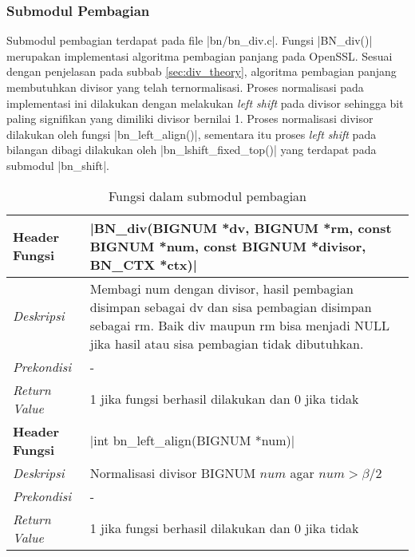 
\subsubsection{Submodul Pembagian} \label{sec:impl_div}
  Submodul pembagian terdapat pada file |bn/bn_div.c|. Fungsi |BN_div()| merupakan implementasi algoritma pembagian panjang pada OpenSSL. Sesuai dengan penjelasan pada subbab \ref{sec:div_theory}, algoritma pembagian panjang membutuhkan divisor yang telah ternormalisasi. Proses normalisasi pada implementasi ini dilakukan dengan melakukan \textit{left shift} pada divisor sehingga bit paling signifikan yang dimiliki divisor bernilai 1. Proses normalisasi divisor dilakukan oleh fungsi |bn_left_align()|, sementara itu proses \textit{left shift} pada bilangan dibagi dilakukan oleh |bn_lshift_fixed_top()| yang terdapat pada submodul |bn_shift|.

  \begin{table}[h]
    \caption{Fungsi dalam submodul pembagian}
    \begin{tabular}{R{2.8cm}L{10.5cm}}
      \toprule
      \textbf{Header Fungsi} & |BN_div(BIGNUM *dv, BIGNUM *rm, const BIGNUM *num, const BIGNUM *divisor, BN_CTX *ctx)|                                                                                                       \\ \midrule
      \textit{Deskripsi}     & Membagi num dengan divisor, hasil pembagian disimpan sebagai dv dan sisa pembagian disimpan sebagai rm. Baik div maupun rm bisa menjadi NULL jika hasil atau sisa pembagian tidak dibutuhkan. \\
      \textit{Prekondisi}    & - \\
      \textit{Return Value}  & 1 jika fungsi berhasil dilakukan dan 0 jika tidak
      \\ \bottomrule
      \textbf{Header Fungsi} & |int bn_left_align(BIGNUM *num)|                                                                                                                                                              \\ \midrule
      \textit{Deskripsi}     & Normalisasi divisor BIGNUM $num$ agar $num > \beta/2$  \\
      \textit{Prekondisi}    & - \\
      \textit{Return Value}  & 1 jika fungsi berhasil dilakukan dan 0 jika tidak
      \\ \bottomrule
    \end{tabular}
  \end{table}
